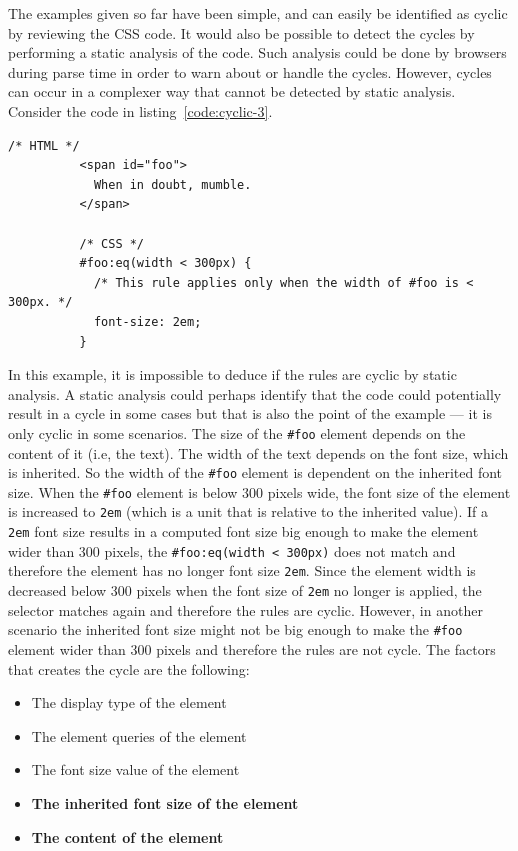\documentclass[a4paper,11pt]{kth-mag}
\newcommand{\code}[1]{\texttt{#1}}
\begin{document}
        The examples given so far have been simple, and can easily be identified as cyclic by reviewing the \gls{CSS} code.
        It would also be possible to detect the cycles by performing a static analysis of the code.
        Such analysis could be done by browsers during parse time in order to warn about or handle the cycles.
        However, cycles can occur in a complexer way that cannot be detected by static analysis.
        Consider the code in listing~\ref{code:cyclic-3}.
        \begin{lstlisting}[gobble=10,caption={Example of cyclic rules that cannot be detected by static analysis.}, captionpos=b, label={code:cyclic-3}]
          /* HTML */
          <span id="foo">
            When in doubt, mumble.
          </span>

          /* CSS */
          #foo:eq(width < 300px) {
            /* This rule applies only when the width of #foo is < 300px. */
            font-size: 2em;
          }
        \end{lstlisting}
        In this example, it is impossible to deduce if the rules are cyclic by static analysis.
        A static analysis could perhaps identify that the code could potentially result in a cycle in some cases but that is also the point of the example --- it is only cyclic in some scenarios.
        The size of the \code{\#foo} element depends on the content of it (i.e, the text).
        The width of the text depends on the font size, which is inherited.
        So the width of the \code{\#foo} \gls{element} is dependent on the inherited font size.
        When the \code{\#foo} \gls{element} is below 300 pixels wide, the font size of the element is increased to \code{2em} (which is a unit that is relative to the inherited value).
        If a \code{2em} font size results in a computed font size big enough to make the \gls{element} wider than 300 pixels, the \code{\#foo:eq(width < 300px)} does not match and therefore the element has no longer font size \code{2em}.
        Since the element width is decreased below 300 pixels when the font size of \code{2em} no longer is applied, the selector matches again and therefore the rules are cyclic.
        However, in another scenario the inherited font size might not be big enough to make the \code{\#foo} element wider than 300 pixels and therefore the rules are not cycle.
        The factors that creates the cycle are the following:
        \begin{itemize}
          \item The display type of the \gls{element}
          \item The \gls{element} queries of the \gls{element}
          \item The font size value of the \gls{element}
          \item \textbf{The inherited font size of the \gls{element}}
          \item \textbf{The content of the \gls{element}}
        \end{itemize}
\end{document}
